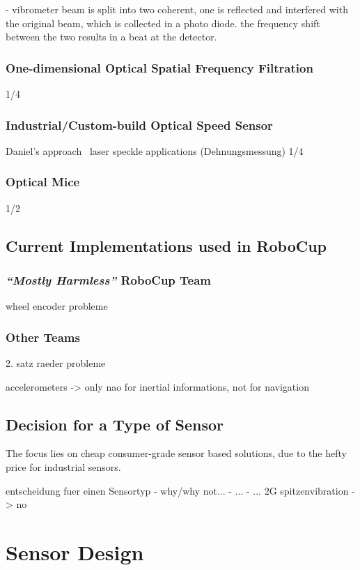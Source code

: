 \documentclass[12pt,a4paper]{article}
\newcommand{\MH}{\emph{``Mostly Harmless''} RoboCup Team\xspace}
\begin{document}

- vibrometer
  beam is split into two coherent, one is reflected and interfered with the original beam, which is collected in a photo diode. 
  the frequency shift between the two results in a beat at the detector.


\subsubsection{One-dimensional Optical Spatial Frequency Filtration}
1/4
\subsubsection{Industrial/Custom-build Optical Speed Sensor}
        Daniel's approach~\cite{Hrach2006}
        laser speckle applications (Dehnungsmessung) 
1/4
\subsubsection{Optical Mice}
1/2

\subsection{Current Implementations used in RoboCup}

\subsubsection{\MH}
      wheel encoder
        probleme
\subsubsection{Other Teams}
      2. satz raeder
        probleme

  accelerometers -> only nao for inertial informations, not for navigation

\subsection{Decision for a Type of Sensor}

The focus lies on cheap consumer-grade sensor based solutions, due to the hefty price for industrial sensors.

  entscheidung fuer einen Sensortyp
    - why/why not...
    - ...
    - ...
        2G spitzenvibration -> no


\section{Sensor Design}
\end{document}
